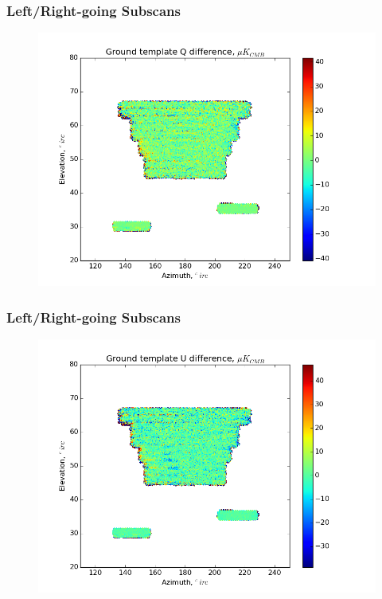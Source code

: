 \documentclass{beamer}
\begin{document}
\begin{frame}
\frametitle{Left/Right-going Subscans}
\begin{figure}
\includegraphics[width=0.9\linewidth]{dQ_gt_LR_SUBSCAN.png}
\end{figure}
\end{frame}

\begin{frame}
\frametitle{Left/Right-going Subscans}
\begin{figure}
\includegraphics[width=0.9\linewidth]{dU_gt_LR_SUBSCAN.png}
\end{figure}
\end{frame}
\end{document}

